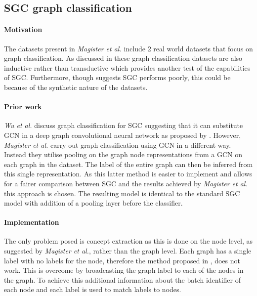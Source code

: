 \subsection{SGC graph classification}
\paragraph{Motivation}
The datasets present in \textit{Magister et al.}\cite{magister2021gcexplainer} include 2 real world datasets that focus on graph classification.
As discussed in  these graph classification datasets are also inductive rather than transductive which provides another test of the capabilities of SGC.
Furthermore, though  suggests SGC performs poorly, this could be because of the synthetic nature of the datasets.

\paragraph{Prior work}
\textit{Wu et al.}\cite{wu2019simplifying} discuss graph classification for SGC suggesting that it can substitute GCN in a deep graph convolutional neural network as proposed by .
However, \textit{Magister et al.} carry out graph classification using GCN in a different way.
Instead they utilise pooling on the graph node representations from a GCN on each graph in the dataset.
The label of the entire graph can then be inferred from this single representation.
As this latter method is easier to implement and allows for a fairer comparison between SGC and the results achieved by \textit{Magister et al.} this approach is chosen.
The resulting model is identical to the standard SGC model with addition of a pooling layer before the classifier.

\paragraph{Implementation}
The only problem posed is concept extraction as this is done on the node level, as suggested by \textit{Magister et al.}, rather than the graph level.
Each graph has a single label with no labels for the node, therefore the method proposed in , does not work.
This is overcome by broadcasting the graph label to each of the nodes in the graph.
To achieve this additional information about the batch identifier of each node and each label is used to match labels to nodes.

